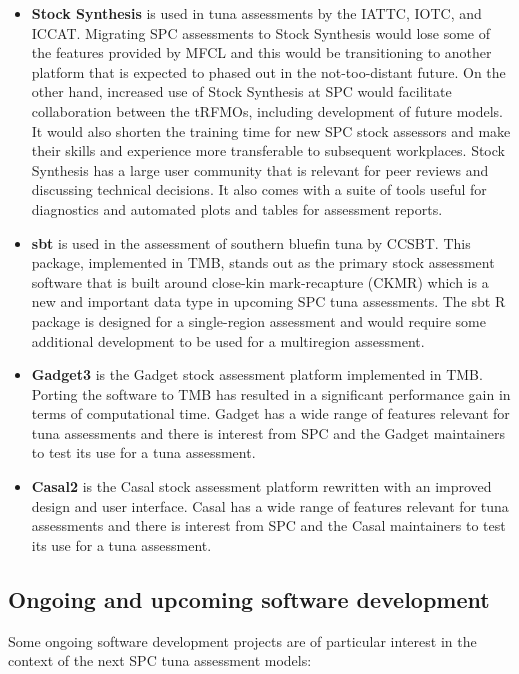 \documentclass{SCreport}
\begin{document}
\begin{itemize}
  \item \textbf{Stock Synthesis} is used in tuna assessments by the IATTC, IOTC,
  and ICCAT. Migrating SPC assessments to Stock Synthesis would lose some of the
  features provided by MFCL and this would be transitioning to another platform
  that is expected to phased out in the not-too-distant future. On the other
  hand, increased use of Stock Synthesis at SPC would facilitate collaboration
  between the tRFMOs, including development of future models. It would also
  shorten the training time for new SPC stock assessors and make their skills
  and experience more transferable to subsequent workplaces. Stock Synthesis has
  a large user community that is relevant for peer reviews and discussing
  technical decisions. It also comes with a suite of tools useful for
  diagnostics and automated plots and tables for assessment reports.
  \item \textbf{sbt} is used in the assessment of southern bluefin tuna by
  CCSBT. This package, implemented in TMB, stands out as the primary stock
  assessment software that is built around close-kin mark-recapture (CKMR) which
  is a new and important data type in upcoming SPC tuna assessments. The
  \textsf{sbt} R package is designed for a single-region assessment and would
  require some additional development to be used for a multiregion assessment.
  \item \textbf{Gadget3} is the Gadget stock assessment platform implemented in
  TMB. Porting the software to TMB has resulted in a significant performance
  gain in terms of computational time. Gadget has a wide range of features
  relevant for tuna assessments and there is interest from SPC and the Gadget
  maintainers to test its use for a tuna assessment.
  \item \textbf{Casal2} is the Casal stock assessment platform rewritten with an
  improved design and user interface. Casal has a wide range of features
  relevant for tuna assessments and there is interest from SPC and the Casal
  maintainers to test its use for a tuna assessment.
\end{itemize}

\subsection{Ongoing and upcoming software development}

Some ongoing software development projects are of particular interest in the
context of the next SPC tuna assessment models:
\end{document}
